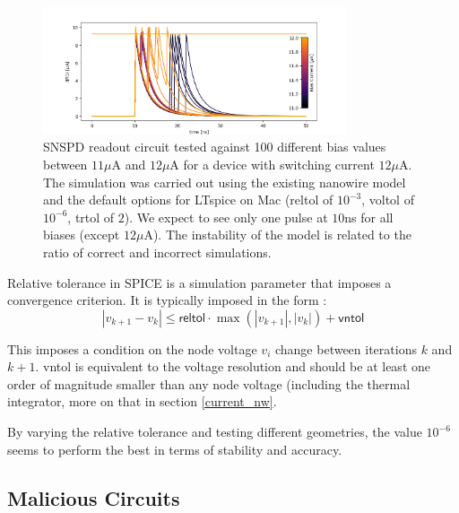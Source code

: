 \documentclass[]{article}
\newcommand{\todoref}[2][]{}
\newcommand{\todoidea}[2][]{}
\newcommand{\cf}[1]{\textsf{#1}}
\begin{document}
\begin{figure}
    \centering
    \includegraphics[width=0.8\textwidth]{figs/jumbled_mess_alone.png}
    \caption{SNSPD readout circuit tested against 100 different bias values between
    $11\mu$A and $12\mu$A for a device with switching current $12\mu$A. The simulation
    was carried out using the existing nanowire model and the default options for LTspice
    on Mac (\cf{reltol} of $10^{-3}$, \cf{voltol} of $10^{-6}$, \cf{trtol} of $2$). 
    We expect to see only
    one pulse at $10$ns for all biases (except $12\mu$A). The instability of the model is
    related to the ratio of correct and incorrect simulations.}
    \label{fig:sweepbias}
\end{figure}

\todoref[]{references for this section :|}

Relative tolerance in SPICE is a simulation parameter that imposes a convergence criterion.
It is typically imposed in the form \cite{accurate_sim_in_spice_kundert}:
$$|v_{k+1} - v_k| \leq \cf{reltol} \cdot \max(|v_{k+1}|, |v_k|) + \cf{vntol}$$

This imposes a condition on the node voltage $v_i$ change between iterations $k$ and $k+1$.
\cf{vntol} is equivalent to the voltage resolution and should be at least one order of magnitude
smaller than any node voltage (including the thermal integrator, more on that in section
\ref{current_nw}.


By varying the relative tolerance and testing different geometries, the value $10^{-6}$
seems to perform the best in terms of stability and accuracy. 

\todoidea[inline]{Nanowire operating region is 1e-6 reltol. Reltol vs nanowire-C tank!}



\subsection{Malicious Circuits}
\end{document}
